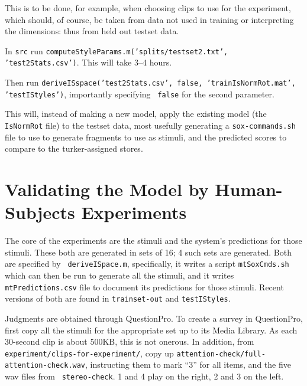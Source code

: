 \documentclass[11pt]{article}
\begin{document}
This is to be done, for example, when choosing clips to use for the
experiment, which should, of course, be taken from data not used in
training or interpreting the dimensions: thus from held out testset
data.

In {\tt src} run {\tt computeStyleParams.m('splits/testset2.txt',
  'test2Stats.csv')}.  This will take  3--4 hours.

Then run {\tt deriveISspace('test2Stats.csv', false,
  'trainIsNormRot.mat', 'testIStyles')}, importantly specifying {\tt
  false} for the second parameter.

This will, instead of making a new model, apply the existing model
(the {\tt IsNormRot} file) to the testset data, most usefully
generating a {\tt sox-commands.sh} file to use to generate fragments
to use as stimuli, and the predicted scores to compare to the
turker-assigned stores.


\section{Validating the Model by Human-Subjects Experiments}

The core of the experiments are the stimuli and the system's
predictions for those stimuli.  These both are generated in sets of
16; 4 such sets are generated.  Both are specified by {\tt
  deriveISpace.m}, specifically, it writes a script {\tt mtSoxCmds.sh}
which can then be run to generate all the stimuli, and it writes {\tt
  mtPredictions.csv} file to document its predictions for those
stimuli.  Recent versions of both are found in {\tt trainset-out} and
{\tt testIStyles}.

Judgments are obtained through QuestionPro.  To create a survey in
QuestionPro, first copy all the stimuli for the appropriate set up to
its Media Library.  As each 30-second clip is about 500KB, this is not
onerous. In addition, from {\tt experiment/clips-for-experiment/},
copy up {\tt attention-check/full-attention-check.wav}, instructing
them to mark ``3'' for all items, and the five wav files from {\tt
  stereo-check}.  1 and 4 play on the right, 2 and 3 on the left.
\end{document}
